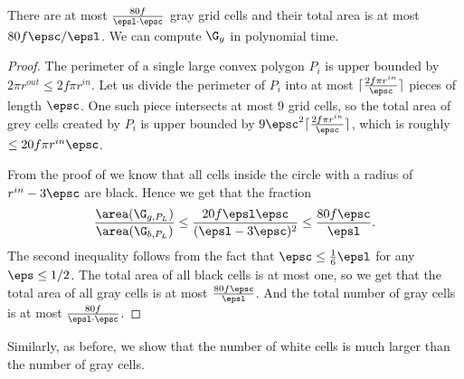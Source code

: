 \begin{lem} \label{lem:gray-circles-polygon}
There are at most $\frac{80 f}{\epsl \cdot \epsc}$ gray grid cells and their total area is at most~$80 f \epsc/ \epsl$.
 We can compute $\G_g$ in polynomial time.
\end{lem} 
\begin{proof}
	The perimeter of a single large convex polygon $P_i$ is upper bounded by $2 \pi r^{out} \le 2 f \pi r^{in}$. Let us divide the perimeter of $P_i$ into at most $\lceil\frac{2 f \pi r^{in}}{\epsc}\rceil$ pieces of length $\epsc$.
	One such piece intersects at most $9$ grid cells, so the total area of grey cells created by $P_i$ is upper bounded by $9 \epsc^2 \lceil\frac{2 f \pi r^{in}}{\epsc}\rceil$, which is roughly  $\le 20f\pi r^{in}\epsc$. 
	
	From the proof of  we know that all cells inside the circle with a radius of $r^{in}- 3\epsc$ are black. Hence we get that the fraction \[
	\frac{\area(\G_{g, P_L})}{\area(\G_{b, P_L})} \leq \frac{20 f \epsl \epsc}{(\epsl - 3 \epsc)^2} \leq \frac{80 f \epsc}{\epsl}.
	\]
	The second inequality follows from the fact that $\epsc \leq \frac{1}{6} \epsl$ for any $\eps \leq 1/2$.  
	The total area of all black cells is at most one, so we get that the total area of all gray cells is at most $\frac{80 f \epsc}{\epsl}$.
 And the total number of gray cells is at most $\frac{80 f}{\epsl \cdot \epsc}$.

\end{proof}


Similarly, as before, we show that the number of white cells is much larger than the number of gray cells.

